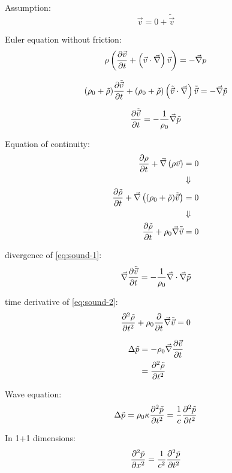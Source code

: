 Assumption:
\begin{equation}
\vec{v}=0+\tilde{\vec{v}}
\end{equation}

Euler equation without friction:
\begin{equation}
\rho\left(\frac{\partial \vec{v}}{\partial t}+\left(\vec{v}\cdot\vec{\nabla}\right)\vec{v}\right)=-\vec{\nabla}p
\end{equation}

\begin{equation}
(\rho_0 + \tilde{\rho})\frac{\partial \tilde{\vec{v}}}{\partial t}+(\rho_0+\tilde{\rho})\left(\tilde{\vec{v}}\cdot\vec{\nabla}\right)\tilde{\vec{v}} = -\vec{\nabla}\tilde{p}
\end{equation}

\begin{equation}\label{eq:sound-1}
\frac{\partial \tilde{\vec{v}}}{\partial t}=-\frac{1}{\rho_0}\vec{\nabla}\tilde{p}
\end{equation}

Equation of continuity:
\begin{align}
\frac{\partial \rho}{\partial t}+\vec{\nabla}\left(\rho\vec{v}\right)&=0\\
&\Downarrow\notag\\
\frac{\partial \tilde{\rho}}{\partial t}+\vec{\nabla}\left((\rho_0+\tilde{\rho})\tilde{\vec{v}}\right) &= 0\\
&\Downarrow\notag\\
\frac{\partial \tilde{\rho}}{\partial t}+\rho_0\vec{\nabla}\tilde{\vec{v}}&=0\label{eq:sound-2}
\end{align}

divergence of \eqref{eq:sound-1}:
\begin{equation}
\vec{\nabla}\frac{\partial \tilde{\vec{v}}}{\partial t}=-\frac{1}{\rho_0}\vec{\nabla}\cdot\vec{\nabla}\tilde{p}
\end{equation}

time derivative of \eqref{eq:sound-2}:
\begin{equation}
\frac{\partial^2 \tilde{\rho}}{\partial t^2}+\rho_0\frac{\partial }{\partial t}\vec{\nabla}\tilde{\vec{v}}=0
\end{equation}

\begin{align}
\Delta\tilde{p} &= -\rho_0\vec{\nabla}\frac{\partial \vec{v}}{\partial t} \\
&= \frac{\partial^2 \tilde{\rho}}{\partial t^2}
\end{align}

Wave equation:
\begin{equation}
\Delta\tilde{p} = \rho_0\kappa\frac{\partial^2 \tilde{p}}{\partial t^2} = \frac{1}{c}\frac{\partial^2 \tilde{p}}{\partial t^2}
\end{equation}

In 1+1 dimensions:
\begin{equation}
\frac{\partial^2 \tilde{p}}{\partial x^2} = \frac{1}{c^2}\frac{\partial^2 \tilde{p}}{\partial t^2}
\end{equation}

